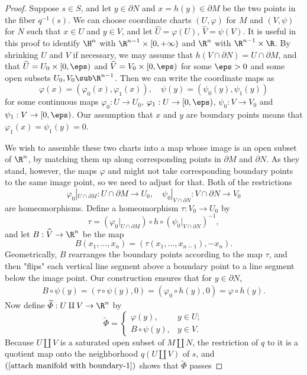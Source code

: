 \begin{proof}
Suppose $s\in S$, and let $y\in\partial N$ and $x=h(y)\in\partial M$ be the two points in the fiber $q^{-1}(s)$. We can choose coordinate charts $(U,\varphi)$ for $M$ and $(V,\psi)$ for $N$ such that $x\in U$ and $y\in V$, and let $\widehat{U}=\varphi(U)$, $\widehat{V}=\psi(V)$. It is useful in this proof to identify $\H^n$ with $\R^{n-1}\times[0,+\infty)$ and $\R^n$ with $\R^{n-1}\times\R$. By shrinking $U$ and $V$ if necessary, we may assume that $h(V\cap\partial N)=U\cap\partial M$, and that $\widehat{U}=U_0\times[0,\eps)$ and $\widehat{V}=V_0\times[0,\eps)$ for some $\eps>0$ and some open subsets $U_0,V_0\sub\R^{n-1}$. Then we can write the coordinate maps as 
\[\varphi(x)=(\varphi_0(x),\varphi_1(x)),\quad\psi(y)=(\psi_0(y),\psi_1(y))\]
for some continuous maps $\varphi_0:U\to U_0$, $\varphi_1:U\to[0,\eps)$, $\psi_0:V\to V_0$ and $\psi_1:V\to[0,\eps)$. Our assumption that $x$ and $y$ are boundary points means that $\varphi_1(x)=\psi_1(y)=0$.\par
We wish to assemble these two charts into a map whose image is an open subset of $\R^n$, by matching them up along corresponding points in $\partial M$ and $\partial N$. As they stand, however, the maps $\varphi$ and might not take corresponding boundary points to the same image point, so we need to adjust for that. Both of the restrictions
\[\varphi_0|_{U\cap\partial M}:U\cap\partial M\to U_0,\quad \psi_0|_{V\cap\partial N}:V\cap\partial N\to V_0\]
are homeomorphisms. Define a homeomorphism $\tau:V_0\to U_0$ by
\[\tau=(\varphi_0|_{U\cap\partial M})\circ h\circ(\psi_0|_{V\cap\partial N})^{-1},\]
and let $B:\widehat{V}\to\R^n$ be the map
\[B(x_1,\dots,x_n)=(\tau(x_1,\dots,x_{n-1}),-x_n).\]
Geometrically, $B$ rearranges the boundary points according to the map $\tau$, and then "flips" each vertical line segment above a boundary point to a line segment below the image point. Our construction ensures that for $y\in\partial N$,
\begin{align}\label{attach manifold with boundary-1}
B\circ\psi(y)=(\tau\circ\psi(y),0)=(\varphi_0\circ h(y),0)=\varphi\circ h(y).
\end{align}
Now define $\widetilde{\varPhi}:U\amalg V\to\R^n$ by
\[\widetilde{\varPhi}=\begin{cases}
\varphi(y),&y\in U;\\
B\circ\psi(y),&y\in V.
\end{cases}\]
Because $U\amalg V$ is a saturated open subset of $M\amalg N$, the restriction of $q$ to it is a quotient map onto the neighborhood $q(U\amalg V)$ of $s$, and $(\ref{attach manifold with boundary-1})$ shows that $\widetilde{\varPhi}$ passes

\end{proof}
